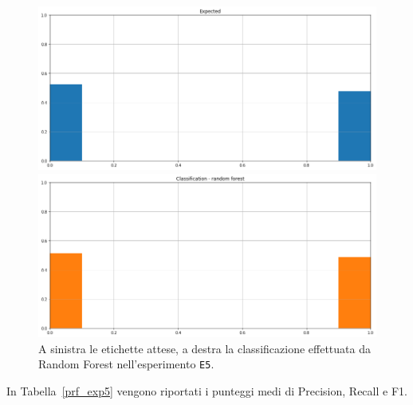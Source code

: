 \documentclass[12pt]{report}
\theoremstyle{definition}
\begin{document}
\begin{figure}
\centering
    \begin{minipage}{0.48\textwidth}
        \includegraphics[width=\linewidth]{images/experiment_beta5_sovrapposti/expected_classification.png}
    \end{minipage}
    \begin{minipage}{0.48\textwidth}
        \includegraphics[width=\linewidth]{images/experiment_beta5_sovrapposti/prediction_classification_rf.png}
    \end{minipage}
    \caption{A sinistra le etichette attese, a destra la classificazione effettuata da Random Forest nell'esperimento \texttt{E5}.}
    \label{rf_class_exp5}
\end{figure} 
In Tabella~\ref{prf_exp5} vengono riportati i punteggi medi di Precision, Recall e F1.
\end{document}
